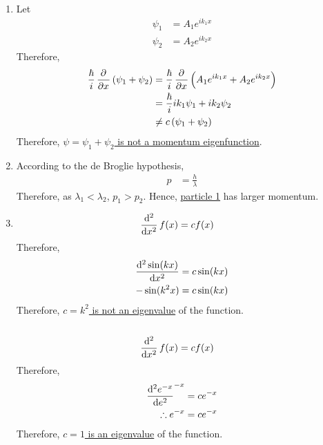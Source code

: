 \documentclass[fleqn, a4paper, 11pt, oneside]{amsart}
\theoremstyle{definition}
\theoremstyle{theorem}
\renewcommand{\emph}{\uline}
\begin{document}
\begin{solution}
	\begin{enumerate}[leftmargin=*]
		\item
			Let
			\begin{align*}
				\psi_1 & = A_1 e^{i k_1 x} \\
				\psi_2 & = A_2 e^{i k_2 x}
			\end{align*}
			Therefore,
			\begin{align*}
				\frac{\hbar}{i} \dpd{}{x}\left( \psi_1 + \psi_2 \right) & = \frac{\hbar}{i} \dpd{}{x}\left( A_1 e^{i k_1 x} + A_2 e^{i k_2 x} \right) \\
                                                                                        & = \frac{\hbar}{i} i k_1 \psi_1 + i k_2 \psi_2                               \\
                                                                                        & \neq c \left( \psi_1 + \psi_2 \right)
			\end{align*}
			Therefore, \emph{$\psi = \psi_1 + \psi_2$ is not a momentum eigenfunction}.
		\item
			According to the de Broglie hypothesis,
			\begin{align*}
				p & = \frac{h}{\lambda}
			\end{align*}
			Therefore, as $\lambda_1 < \lambda_2$, $p_1 > p_2$.
			Hence, \emph{particle 1} has larger momentum.
		\item
			\begin{align*}
				\dod[2]{}{x} f(x) & = c f(x)
			\end{align*}
			Therefore,
			\begin{align*}
				\dod[2]{\sin(k x)}{x} & = c \sin(k x) \\
				-\sin(k^2 x)          & = c \sin(k x)
			\end{align*}
			Therefore, \emph{$c = k^2$ is not an eigenvalue} of the function.\\
			~\\
			\begin{align*}
				\dod[2]{}{x} f(x) & = c f(x)
			\end{align*}
			Therefore,
			\begin{align*}
				\dod[2]{e^{-x}} e^{-x} & = c e^{-x} \\
				\therefore e^{-x}      & = c e^{-x}
			\end{align*}
			Therefore, \emph{$c = 1$ is an eigenvalue} of the function.\\
			~\\

\end{enumerate}
\end{solution}
\end{document}
